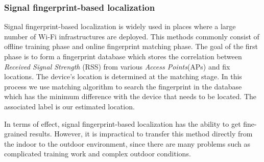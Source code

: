 \subsubsection{Signal fingerprint-based localization}
Signal fingerprint-based localization is widely used in places where a large number of Wi-Fi infrastructures are deployed. This methods commonly consist of offline training phase
and online fingerprint matching phase. The goal of the first phase is to form a fingerprint database which stores the correlation between \textit{Received Signal Strength} (RSS) from
various \textit{Access Points}(APs) and fix locations. The device's location is determined at the matching stage. In this process we use matching algorithm to search the fingerprint
in the database which has the minimum difference with the device that needs to be located. The associated label is our estimated location.

In terms of effect, signal fingerprint-based localization has the ability to get fine-grained results. However, it is impractical to transfer this method directly from the indoor to the
outdoor environment, since there are many problems such as complicated training work and complex outdoor conditions.




